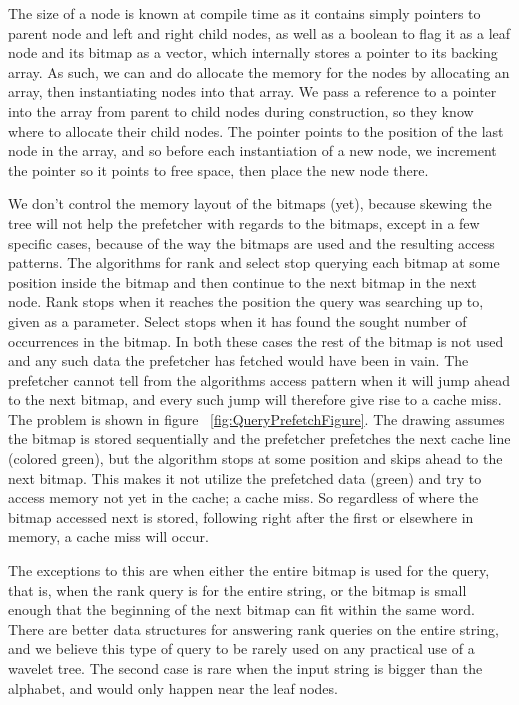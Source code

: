 The size of a node is known at compile time as it contains simply pointers to parent node and left and right child nodes, as well as a boolean to flag it as a leaf node and its bitmap as a vector, which internally stores a pointer to its backing array.
As such, we can and do allocate the memory for the nodes by allocating an array, then instantiating nodes into that array.
We pass a reference to a pointer into the array from parent to child nodes during construction, so they know where to allocate their child nodes.
The pointer points to the position of the last node in the array, and so before each instantiation of a new node, we increment the pointer so it points to free space, then place the new node there.

We don't control the memory layout of the bitmaps (yet), because skewing the tree will not help the prefetcher with regards to the bitmaps, except in a few specific cases, because of the way the bitmaps are used and the resulting access patterns.
The algorithms for rank and select stop querying each bitmap at some position inside the bitmap and then continue to the next bitmap in the next node.
Rank stops when it reaches the position the query was searching up to, given as a parameter.
Select stops when it has found the sought number of occurrences in the bitmap.
In both these cases the rest of the bitmap is not used and any such data the prefetcher has fetched would have been in vain.
The prefetcher cannot tell from the algorithms access pattern when it will jump ahead to the next bitmap, and every such jump will therefore give rise to a cache miss.
The problem is shown in figure ~\ref{fig:QueryPrefetchFigure}. The drawing assumes the bitmap is stored sequentially and the prefetcher prefetches the next cache line (colored green), but the algorithm stops at some position and skips ahead to the next bitmap. This makes it not utilize the prefetched data (green) and try to access memory not yet in the cache; a cache miss.
So regardless of where the bitmap accessed next is stored, following right after the first or elsewhere in memory, a cache miss will occur.

The exceptions to this are when either the entire bitmap is used for the query, that is, when the rank query is for the entire string, or the bitmap is small enough that the beginning of the next bitmap can fit within the same word.
There are better data structures for answering rank queries on the entire string, and we believe this type of query to be rarely used on any practical use of a wavelet tree.
The second case is rare when the input string is bigger than the alphabet, and would only happen near the leaf nodes.


